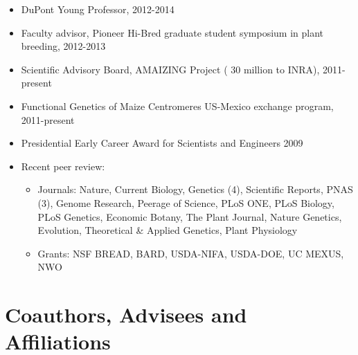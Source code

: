 \documentclass[11pt]{article}
\begin{document}
\begin{itemize} \setlength{\itemsep}{0pt} \setlength{\parskip}{2pt} \setlength{\parsep}{0pt}

\item DuPont Young Professor, 2012-2014

\item Faculty advisor, Pioneer Hi-Bred graduate student symposium in plant breeding, 2012-2013

\item Scientific Advisory Board, AMAIZING Project ( 30 million to INRA), 2011-present 

\item Functional Genetics of Maize Centromeres US-Mexico exchange program, 2011-present

\item Presidential Early Career Award for Scientists and Engineers 2009

\item Recent peer review: 
\begin{itemize} 
\item Journals: Nature, Current Biology, Genetics (4), Scientific Reports, PNAS (3), Genome Research, Peerage of Science, PLoS ONE, PLoS Biology, PLoS Genetics, Economic Botany, The Plant Journal, Nature Genetics, Evolution, Theoretical \& Applied Genetics, Plant Physiology%

\item Grants: NSF BREAD, BARD, USDA-NIFA, USDA-DOE, UC MEXUS, NWO
\end{itemize}
\end{itemize}


\section{Coauthors, Advisees and Affiliations}
\end{document}
